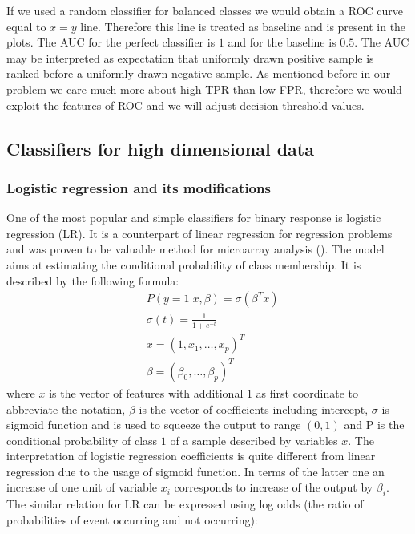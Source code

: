 \documentclass[12pt, wide]{mwart}
\begin{document}
If we used a random classifier for balanced classes we would obtain a ROC curve equal to $x=y$ line. Therefore this line is treated as baseline and is present in the plots. The AUC for the perfect classifier is $1$ and for the baseline is $0.5$. The AUC may be interpreted as expectation that uniformly drawn positive sample is ranked before a uniformly drawn negative sample. As mentioned before in our problem we care much more about high TPR than low FPR, therefore we would exploit the features of ROC and we will adjust decision threshold values.

\subsection{Classifiers for high dimensional data}

\subsubsection{Logistic regression and its modifications} \label{section:logit}

One of the most popular and simple classifiers for binary response is logistic regression (LR). It is a counterpart of linear regression for regression problems and was proven to be valuable method for microarray analysis (\cite{LRgene}). The model aims at estimating the conditional probability of class membership. It is described by the following formula:
\begin{align*}
    &P(y=1 | x, \beta)=\sigma\left(\beta^{T} x\right) \\
    &\sigma(t) = \frac{1}{1+e^{-t}} \\
    &x=(1, x_1, \ldots, x_p)^T \\
    &\beta = (\beta_0, \ldots, \beta_p)^T
\end{align*}
where $x$ is the vector of features with additional $1$ as first coordinate to abbreviate the notation, $\beta$ is the vector of coefficients including intercept, $\sigma$ is sigmoid function and is used to squeeze the output to range $(0,1)$ and P is the conditional probability of class $1$ of a sample described by variables $x$. The interpretation of logistic regression coefficients is quite different from linear regression due to the usage of sigmoid function. In terms of the latter one an increase of one unit of variable $x_i$ corresponds to increase of the output by $\beta_i$. The similar relation for LR can be expressed using log odds (the ratio of probabilities of event occurring and not occurring):
\end{document}
